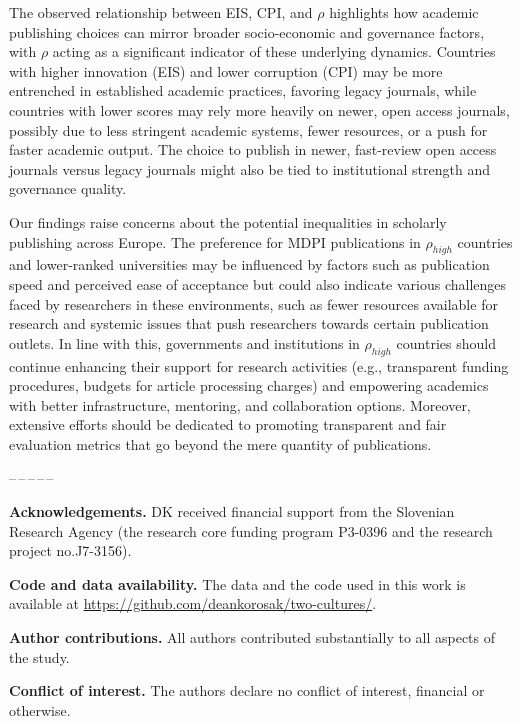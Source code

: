 \documentclass[amsfonts, amssymb, prl, superscriptaddress, notitlepage, twocolumn, nofootinbib]{revtex4-2}
\begin{document}
The observed relationship between EIS, CPI, and $\rho$ highlights how academic publishing choices can mirror broader socio-economic and governance factors, with $\rho$ acting as a significant indicator of these underlying dynamics. Countries with higher innovation (EIS) and lower corruption (CPI) may be more entrenched in established academic practices, favoring legacy journals, while countries with lower scores may rely more heavily on newer, open access journals, possibly due to less stringent academic systems, fewer resources, or a push for faster academic output. The choice to publish in newer, fast-review open access journals versus legacy journals might also be tied to institutional strength and governance quality. 

Our findings raise concerns about the potential inequalities in scholarly publishing across Europe. The preference for MDPI publications in $\rho_{high}$ countries and lower-ranked universities may be influenced by factors such as publication speed and perceived ease of acceptance but could also indicate various challenges faced by researchers in these environments, such as fewer resources available for research and systemic issues that push researchers towards certain publication outlets. In line with this, governments and institutions in $\rho_{high}$ countries should continue enhancing their support for research activities (e.g., transparent funding procedures, budgets for article processing charges) and empowering academics with better infrastructure, mentoring, and collaboration options. Moreover, extensive efforts should be dedicated to promoting transparent and fair evaluation metrics that go beyond the mere quantity of publications. 

  
\begin{center}
--\,--\,--\,--\,--
\end{center}
\vspace{1mm}
\noindent\textbf{Acknowledgements.} DK received financial support from the Slovenian Research Agency (the research core funding program P3-0396 and the research project no.J7-3156). 

\noindent\textbf{Code and data availability.} The data and the code used in this work is available at \url{https://github.com/deankorosak/two-cultures/}.

\noindent\textbf{Author contributions.} All authors contributed substantially to all aspects of the study.

\noindent\textbf{Conflict of interest.} The authors declare no conflict of interest, financial or otherwise.
 

{}

\end{document}
